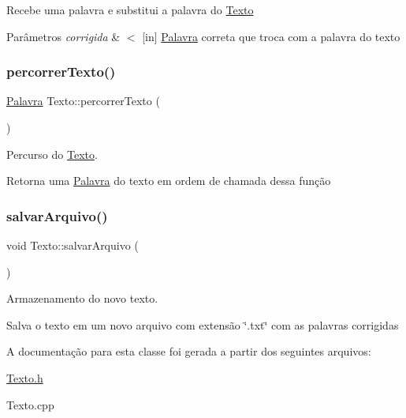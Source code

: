Recebe uma palavra e substitui a palavra do \hyperlink{classTexto}{Texto} 
\begin{DoxyParams}{Parâmetros}
{\em corrigida} & $<$ \mbox{[}in\mbox{]} \hyperlink{classPalavra}{Palavra} correta que troca com a palavra do texto \\
\hline
\end{DoxyParams}
\mbox{\label{classTexto_ad5a75aaf1bd72a2ed320cd88f5855fa1}} 
\subsubsection{\texorpdfstring{percorrer\+Texto()}{percorrerTexto()}}
{\footnotesize\ttfamily \hyperlink{classPalavra}{Palavra} Texto\+::percorrer\+Texto (\begin{DoxyParamCaption}{ }\end{DoxyParamCaption})}



Percurso do \hyperlink{classTexto}{Texto}. 

Retorna uma \hyperlink{classPalavra}{Palavra} do texto em ordem de chamada dessa função \mbox{\label{classTexto_aa637986e50d826319f321167dfaf2d9c}} 
\subsubsection{\texorpdfstring{salvar\+Arquivo()}{salvarArquivo()}}
{\footnotesize\ttfamily void Texto\+::salvar\+Arquivo (\begin{DoxyParamCaption}{ }\end{DoxyParamCaption})}



Armazenamento do novo texto. 

Salva o texto em um novo arquivo com extensão \char`\"{}.\+txt\char`\"{} com as palavras corrigidas 

A documentação para esta classe foi gerada a partir dos seguintes arquivos\+:\begin{DoxyCompactItemize}
\item 
\hyperlink{Texto_8h}{Texto.\+h}\item 
Texto.\+cpp\end{DoxyCompactItemize}
